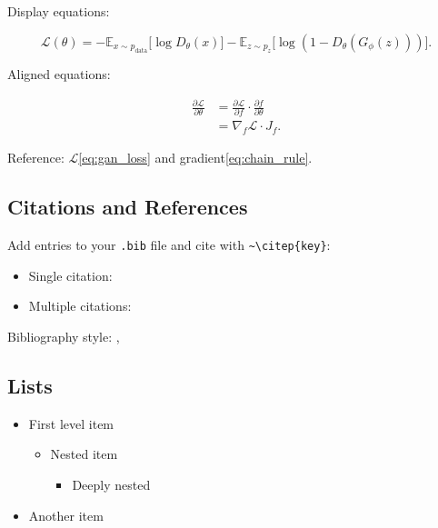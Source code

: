 \documentclass[]{fairmeta} %
\theoremstyle{plain}
\theoremstyle{definition}
\theoremstyle{remark}
\begin{document}
Display equations:

\begin{equation}
    \mathcal{L}(\theta) = -\mathbb{E}_{x\sim p_{\text{data}}}\big[\log D_\theta(x)\big]
    - \mathbb{E}_{z\sim p_z}\big[\log(1-D_\theta(G_\phi(z)))\big].
    \label{eq:gan_loss}
\end{equation}

Aligned equations:

\begin{align}
    \frac{\partial \mathcal{L}}{\partial \theta}
        &= \frac{\partial \mathcal{L}}{\partial f} \cdot \frac{\partial f}{\partial \theta} \\
        &= \nabla_f \mathcal{L} \cdot J_f.
    \label{eq:chain_rule}
\end{align}

Reference: $\mathcal{L}$\verb||\!\eqref{eq:gan_loss} and gradient\verb||\!\eqref{eq:chain_rule}.


\subsection{Citations and References}
\label{sec:citations}

Add entries to your \texttt{.bib} file and cite with \verb|~\citep{key}|:

\begin{itemize}
  \item Single citation:~\citep{vaswani2017attention}
  \item Multiple citations:~\citep{vaswani2017attention,aggarwal2025l1}
\end{itemize}

Bibliography style: \verb||, \verb||


\subsection{Lists}
\label{sec:lists}

\begin{itemize}
  \item First level item
    \begin{itemize}
      \item Nested item
        \begin{itemize}
          \item Deeply nested
        \end{itemize}
    \end{itemize}
  \item Another item
\end{itemize}
\end{document}

